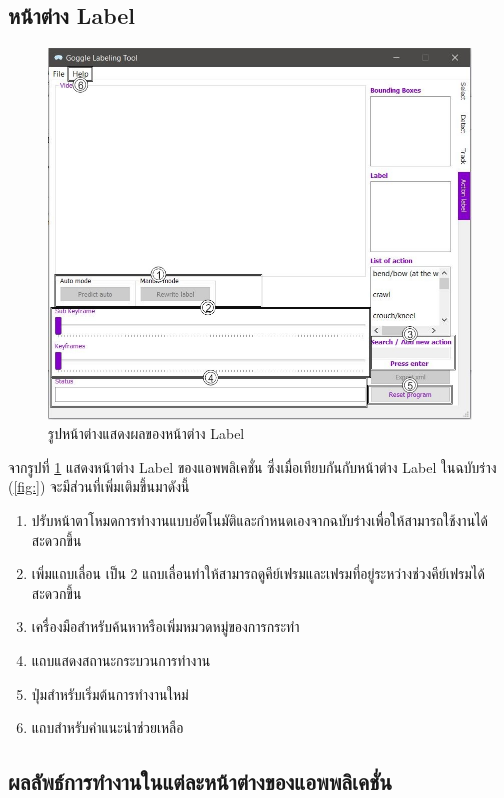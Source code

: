 \subsection*{หน้าต่าง Label}
\begin{figure}[!ht]
  \centering
    \includegraphics[scale=0.4]{chapter4/images/Final_ui/Label.jpg}
    \caption{รูปหน้าต่างแสดงผลของหน้าต่าง Label}
    \label{fig:final_label}
\end{figure}
จากรูปที่ \ref{fig:final_label} แสดงหน้าต่าง Label ของแอพพลิเคชั่น ซึ่งเมื่อเทียบกันกับหน้าต่าง Label ในฉบับร่าง (\ref{fig:}) จะมีส่วนที่เพิ่มเติมขึ้นมาดังนี้
\begin{enumerate}
	\item ปรับหน้าตาโหมดการทำงานแบบอัตโนมัติและกำหนดเองจากฉบับร่างเพื่อให้สามารถใช้งานได้สะดวกขึ้น
	\item เพิ่มแถบเลื่อน เป็น 2 แถบเลื่อนทำให้สามารถดูคีย์เฟรมและเฟรมที่อยู่ระหว่างช่วงคีย์เฟรมได้สะดวกขึ้น
	\item เครื่องมือสำหรับค้นหาหรือเพิ่มหมวดหมู่ของการกระทำ
	\item แถบแสดงสถานะกระบวนการทำงาน
	\item ปุ่มสำหรับเริ่มต้นการทำงานใหม่ 
	\item แถบสำหรับคำแนะนำช่วยเหลือ
\end{enumerate}		

\clearpage
\subsection{ผลลัพธ์การทำงานในแต่ละหน้าต่างของแอพพลิเคชั่น}
